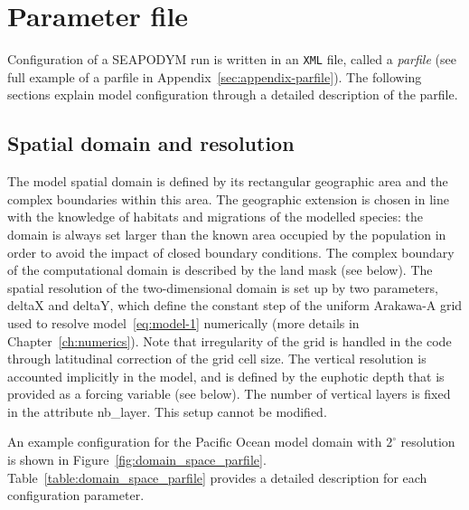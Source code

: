 \section{Parameter file}
Configuration of a SEAPODYM run is written in an \texttt{XML} file, called a \textit{parfile} (see full example of a parfile in Appendix~\ref{sec:appendix-parfile}). The following sections explain model configuration through a detailed description of the parfile. \\

\subsection{Spatial domain and resolution}

The model spatial domain is defined by its rectangular geographic area and the complex boundaries within this area. The geographic extension is chosen in line with the knowledge of habitats and migrations of the modelled species: the domain is always set larger than the known area occupied by the population in order to avoid the impact of closed boundary conditions. The complex boundary of the computational domain is described by the land mask (see below). The spatial resolution of the two-dimensional domain is set up by two parameters, {\ttfamily deltaX} and {\ttfamily deltaY}, which define the constant step of the uniform Arakawa-A grid used to resolve model~\ref{eq:model-1} numerically (more details in Chapter~\ref{ch:numerics}). Note that irregularity of the grid is handled in the code through latitudinal correction of the grid cell size. The vertical resolution is accounted implicitly in the model, and is defined by the euphotic depth that is provided as a forcing variable (see below). The number of vertical layers is fixed in the attribute {\ttfamily nb\_layer}. This setup cannot be modified. 

An example configuration for the Pacific Ocean model domain with $2^{\circ}$ resolution is shown in Figure~\ref{fig:domain_space_parfile}. Table~\ref{table:domain_space_parfile} provides a detailed description for each configuration parameter.  

